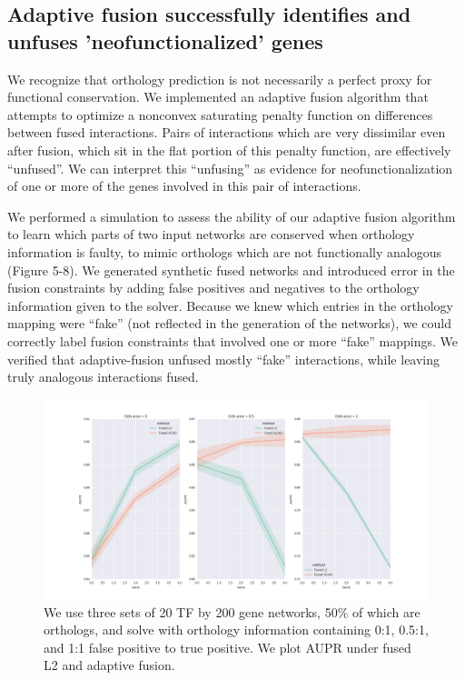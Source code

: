 \documentclass[11pt]{article}
\begin{document}
\subsection{Adaptive fusion successfully identifies and unfuses 'neofunctionalized' genes}
We recognize that orthology prediction is not necessarily a perfect proxy for functional conservation. We implemented an adaptive fusion algorithm that attempts to optimize a nonconvex saturating penalty function on differences between fused interactions. Pairs of interactions which are very dissimilar even after fusion, which sit in the flat portion of this penalty function, are effectively ``unfused''. We can interpret this ``unfusing'' as evidence for neofunctionalization of one or more of the genes involved in this pair of interactions. 

We performed a simulation to assess the ability of our adaptive fusion algorithm to learn which parts of two input networks are conserved when orthology information is faulty, to mimic orthologs which are not functionally analogous  (Figure 5-8). We generated synthetic fused networks and introduced error in the fusion constraints by adding false positives and negatives to the orthology information given to the solver. Because we knew which entries in the orthology mapping were ``fake'' (not reflected in the generation of the networks), we could correctly label fusion constraints that involved one or more ``fake'' mappings. We verified that adaptive-fusion unfused mostly ``fake'' interactions, while leaving truly analogous interactions fused.

\begin{figure}
\begin{center}
  \includegraphics[scale=0.45]{test_scad_opt_params3.png}
  \caption{\label{fig:figure1} We use three sets of 20 TF by 200 gene networks, 50\% of which are orthologs, and solve with orthology information containing 0:1, 0.5:1, and 1:1 false positive to true positive. We plot AUPR under fused L2 and adaptive fusion.}
  \end{center}
\end{figure}
\end{document}
